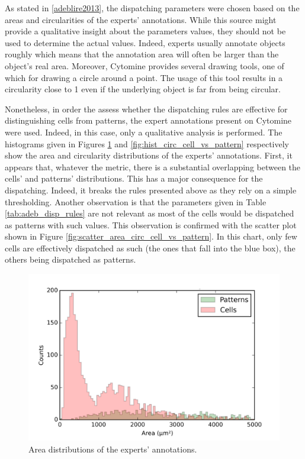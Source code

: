 As stated in \ref{adeblire2013}, the dispatching parameters were chosen based on the areas and circularities of the experts' annotations. While this source might provide a qualitative insight about the parameters values, they should not be used to determine the actual values. Indeed, experts usually annotate objects roughly which means that the annotation area will often be larger than the object's real area. Moreover, Cytomine provides several drawing tools, one of which for drawing a circle around a point. The usage of this tool results in a circularity close to 1 even if the underlying object is far from being circular.

Nonetheless, in order the assess whether the dispatching rules are effective for distinguishing cells from patterns, the expert annotations present on Cytomine were used. Indeed, in this case, only a qualitative analysis is performed. The histograms given in Figures \ref{fig:hist_area_cell_vs_pattern} and \ref{fig:hist_circ_cell_vs_pattern} respectively show the area and circularity distributions of the experts' annotations. First, it appears that, whatever the metric, there is a substantial overlapping between the cells' and patterns' distributions. This has a major consequence for the dispatching. Indeed, it breaks the rules presented above as they rely on a simple thresholding. Another observation is that the parameters given in Table \ref{tab:adeb_disp_rules} are not relevant as most of the cells would be dispatched as patterns with such values. This observation is confirmed with the scatter plot shown in Figure \ref{fig:scatter_area_circ_cell_vs_pattern}. In this chart, only few cells are effectively dispatched as such (the ones that fall into the blue box), the others being dispatched as patterns.


\begin{figure}
	\center
	\includegraphics[scale=0.75]{image/cells_patterns_real_area_0_5000.png}
	\caption{Area distributions of the experts' annotations.}
	\label{fig:hist_area_cell_vs_pattern}
\end{figure}

